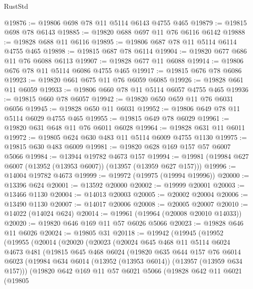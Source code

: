 \begin{lexlean}{RustStd}
\begin{coremodule}
@19876 := @19806 @698 @78 @11 @5114 @6143 @4755 @465
@19879 := @19815 @698 @78 @6143
@19885 := @19820 @688 @697 @11 @76 @6116 @6142
@19888 := @19828 @688 @11 @6116
@19895 := @19806 @687 @78 @11 @5114 @6114 @4755 @465
@19898 := @19815 @687 @78 @6114
@19904 := @19820 @677 @686 @11 @76 @6088 @6113
@19907 := @19828 @677 @11 @6088
@19914 := @19806 @676 @78 @11 @5114 @6086 @4755 @465
@19917 := @19815 @676 @78 @6086
@19923 := @19820 @661 @675 @11 @76 @6059 @6085
@19926 := @19828 @661 @11 @6059
@19933 := @19806 @660 @78 @11 @5114 @6057 @4755 @465
@19936 := @19815 @660 @78 @6057
@19942 := @19820 @650 @659 @11 @76 @6031 @6056
@19945 := @19828 @650 @11 @6031
@19952 := @19806 @649 @78 @11 @5114 @6029 @4755 @465
@19955 := @19815 @649 @78 @6029
@19961 := @19820 @631 @648 @11 @76 @6011 @6028
@19964 := @19828 @631 @11 @6011
@19972 := @19805 @624 @630 @483 @11 @5114 @6009 @4755 @1130
@19975 := @19815 @630 @483 @6009
@19981 := @19820 @628 @169 @157 @57 @6007 @5066
@19984 := @13944 @19782 @4673 @157
@19994 := @19981 (@19984 @627 @6007 (@13952 (@13953 @6007)) (@13957 (@13959 @627 @157)))
@19996 := @14004 @19782 @4673
@19999 := @19972 (@19975 (@19994 @19996))
@20000 := @13396 @624
@20001 := @13592 @20000
@20002 := @19999 @20001
@20003 := @13466 @1130
@20004 := @14013 @20003
@20005 := @20002 @20004
@20006 := @13490 @1130
@20007 := @14017 @20006
@20008 := @20005 @20007
@20010 := @14022 (@14024 @624)
@20014 := @19961 (@19964 (@20008 @20010 @14033))
@20020 := @19820 @646 @169 @11 @57 @6026 @5066
@20023 := @19828 @646 @11 @6026
@20024 := @19805 @31
@20118 := @19942
    (@19945
      (@19952
        (@19955
          (@20014
            (@20020
              (@20023
                (@20024
                  @645
                  @468
                  @11
                  @5114
                  @6024
                  @4673
                  @481
                  (@19815
                    @645
                    @468
                    @6024
                    (@19820
                      @635
                      @644
                      @157
                      @76
                      @6014
                      @6023
                      (@19984 @634 @6014 (@13952 (@13953 @6014)) (@13957 (@13959 @634 @157)))
                      (@19820
                        @642
                        @169
                        @11
                        @57
                        @6021
                        @5066
                        (@19828
                          @642
                          @11
                          @6021
                          (@19805

\end{coremodule}
\end{lexlean}
